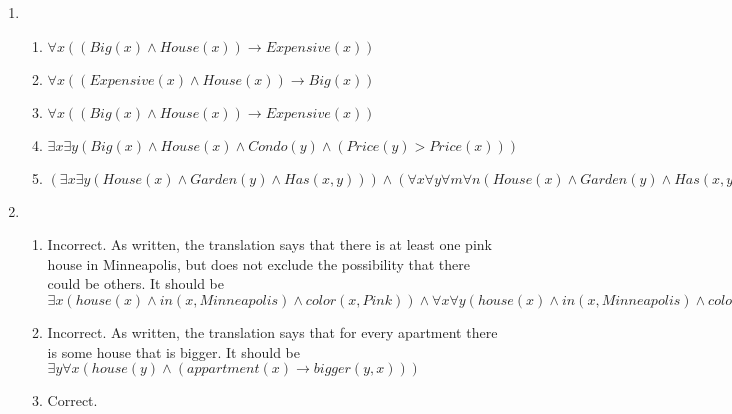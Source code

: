 \documentclass[11pt]{article}
\begin{document}
\begin{enumerate}[label=\bfseries Question \arabic*:]
  \begin{proof} Let \(S\)
    be a statement in CNF such that
    \(S = P_1 \lor P_2 \lor \dots \lor P_n \lor Q_1 \lor Q_2 \lor
    \dots \lor Q_m \) then
    \begin{align*}
      S = (P_1 \lor P_2 \lor \dots \lor P_n) \lor (Q_1 \lor Q_2 \lor
      \dots \lor Q_m)       
      &= \lnot (P_1 \lor P_2 \lor \dots \lor P_n) \rightarrow (Q_1 \lor Q_2 \lor
        \dots \lor Q_m)                    
      \\ &= (\lnot P_1 \land \lnot P_2 \land \dots \land \lnot P_n) \rightarrow (Q_1 \lor Q_2 \lor
           \dots \lor Q_m) 
    \end{align*}
  \end{proof}
\item
  \begin{enumerate}
  \item
    \(\forall x ((Big(x) \land House(x)) \rightarrow Expensive(x))\)
  \item
    \(\forall x ((Expensive(x) \land House(x)) \rightarrow Big(x))\)
  \item
    \(\forall x ((Big(x) \land House(x)) \rightarrow Expensive(x))\)
  \item
    \(\exists x \exists y (Big(x) \land House(x) \land Condo(y) \land
    (Price(y) > Price(x))) \)
  \item
    \((\exists x \exists y (House(x) \land Garden(y) \land Has(x, y)))
    \land (\forall x \forall y \forall m \forall n (House(x) \land
    Garden(y) \land Has(x, y) \land House(m) \land Garden(n) \land
    Has(m, n)) \rightarrow x = m) \)
  \end{enumerate}
\item
  \begin{enumerate}
  \item Incorrect.  As written, the translation says that there is at
    least one pink house in Minneapolis, but does not exclude the
    possibility that there could be others.  It should be
    \(\exists x (house(x) \land in(x, Minneapolis) \land color(x,
    Pink)) \land \forall x \forall y (house(x) \land in(x,
    Minneapolis) \land color(x, Pink) \land house(y) \land in(y,
    Minneapolis) \land color(y, Pink)) \rightarrow x = y\)
  \item Incorrect. As written, the translation says that for every
    apartment there is some house that is bigger.  It should be
    \(\exists y \forall x( house(y) \land (appartment(x) \rightarrow
    bigger(y, x)))\)
  \item Correct.

\end{enumerate}
\end{enumerate}
\end{document}

